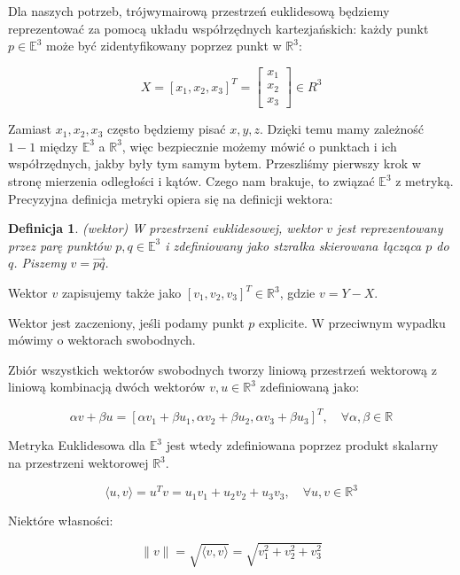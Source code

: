 \documentclass[a4paper,12pt]{article}
\newtheorem{defi}{Definicja}
\newcommand{\E}{\mathbb{E}}
\newcommand{\R}{\mathbb{R}}
\newcommand{\vecs}[2]{\langle #1 , #2 \rangle}
\begin{document}
Dla naszych potrzeb, trójwymairową przestrzeń euklidesową będziemy reprezentować za pomocą układu współrzędnych kartezjańskich: każdy punkt $p \in \E^3$ może być zidentyfikowany poprzez punkt w $\R^3$:

\begin{equation}
X = [x_1, x_2, x_3]^T = 
\begin{bmatrix}
x_1 \\ x_2 \\ x_3
\end{bmatrix}
\in R^3
\end{equation}


Zamiast $x_1,x_2,x_3$ często będziemy pisać $x,y,z$. Dzięki temu mamy zależność $1-1$ między $\E^3$ a $\R^3$, więc bezpiecznie możemy mówić o punktach i ich współrzędnych, jakby były tym samym bytem. Przeszliśmy pierwszy krok w stronę mierzenia odległości i kątów. Czego nam brakuje, to związać $\E^3$ z metryką. Precyzyjna definicja metryki opiera się na definicji wektora:

\begin{defi}(wektor)
W przestrzeni euklidesowej, wektor $v$ jest reprezentowany przez parę punktów $p,q \in \E^3$ i zdefiniowany jako stzrałka skierowana łącząca $p$ do $q$. Piszemy $v = \vec{pq}$.
\end{defi}

\noindent Wektor $v$ zapisujemy także jako $[v_1,v_2,v_3]^T \in \R^3$, gdzie $v = Y - X$.

Wektor jest zaczeniony, jeśli podamy punkt $p$ explicite. W przeciwnym wypadku mówimy o wektorach swobodnych.

Zbiór wszystkich wektorów swobodnych tworzy liniową przestrzeń wektorową z liniową kombinacją dwóch wektorów $v, u \in \R^3$ zdefiniowaną jako:

\begin{equation}
\alpha v + \beta u = [\alpha v_1 + \beta u_1, \alpha v_2 + \beta u_2, \alpha v_3 + \beta u_3]^T, \quad \forall \alpha,\beta \in \R
\end{equation}

Metryka Euklidesowa dla $\E^3$ jest wtedy zdefiniowana poprzez produkt skalarny na przestrzeni wektorowej $\R^3$.

\begin{equation}
\vecs{u}{v} = u^Tv = u_1v_1 + u_2v_2 + u_3v_3, \quad \forall u,v \in \R^3
\end{equation}

Niektóre własności:

\begin{equation}
\| v \| = \sqrt{\vecs{v}{v}} = \sqrt{v^2_1 + v^2_2 + v^2_3}
\end{equation}
\end{document}
